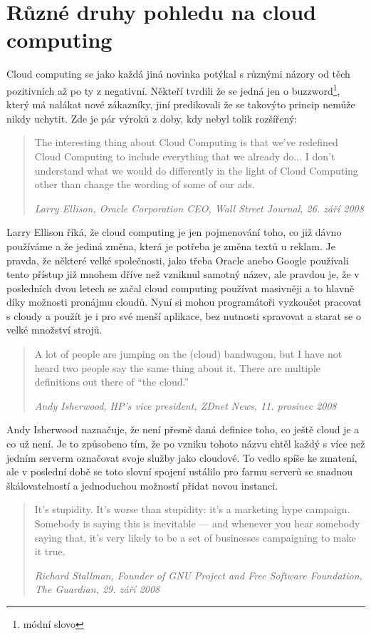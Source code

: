 \section{Různé druhy pohledu na cloud computing}
Cloud computing se jako každá jiná novinka potýkal s různými názory od těch pozitivních až po ty z negativní. Někteří tvrdili že se jedná jen o buzzword\footnote{módní slovo}, který má nalákat nové zákazníky, jiní predikovali že se takovýto princip nemůže nikdy uchytit. Zde je pár výroků  z doby, kdy nebyl tolik rozšířený:

\begin{quotation}
The interesting thing about Cloud Computing is that we’ve redefined Cloud Computing to include everything that we already do...  I don’t understand what we would do differently in the light of Cloud Computing other than change the wording of some of our ads.

\em Larry Ellison, Oracle Corporation CEO, Wall Street Journal, 26. září 2008
\end{quotation}

Larry Ellison říká, že cloud computing je jen pojmenování toho, co již dávno používáme a že jediná změna, která je potřeba je změna textů u reklam. Je pravda, že některé velké společnosti, jako třeba Oracle anebo Google používali tento přístup již mnohem dříve než vzniknul samotný název, ale pravdou je, že v posledních dvou letech se začal cloud computing používat masivněji a to hlavně díky možnosti pronájmu cloudů. Nyní si mohou programátoři vyzkoušet pracovat s cloudy a použít je i pro své menší aplikace, bez nutnosti spravovat a starat se o velké množství strojů.

\begin{quotation}
A lot of people are jumping on the (cloud) bandwagon, but I have not heard two people say the same thing about it. There are multiple definitions out there of “the cloud.”

\em Andy Isherwood, HP’s vice president, ZDnet News, 11. prosinec 2008
\end{quotation}

Andy Isherwood naznačuje, že není přesně daná definice toho, co ještě cloud je a co už není. Je to způsobeno tím, že po vzniku tohoto názvu chtěl každý s více než jedním serverm označovat svoje služby jako cloudové. To vedlo spíše ke zmatení, ale v poslední době se toto slovní spojení ustálilo pro farmu serverů se snadnou škálovatelností a jednoduchou možností přidat novou instanci.

\begin{quotation}
It’s stupidity. It’s worse than stupidity: it’s a marketing hype campaign. Somebody is saying this is inevitable — and whenever you hear somebody saying that, it’s very likely to be a set of businesses campaigning to make it true.

\em Richard Stallman, Founder of GNU Project and Free Software Foundation, The Guardian, 29. září 2008
\end{quotation}

